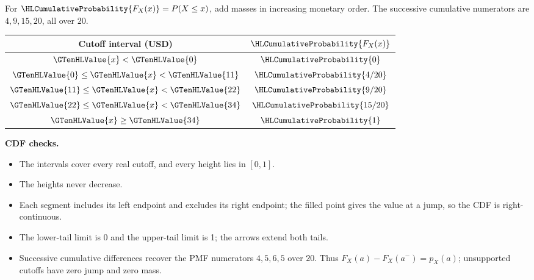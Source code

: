 For $\HLCumulativeProbability{F_X(x)}=P(X\leq x)$, add masses in increasing monetary order. The successive cumulative numerators are $4,9,15,20$, all over $20$.
\begin{center}
\begin{tabular}{cc}\toprule
Cutoff interval (USD) & $\HLCumulativeProbability{F_X(x)}$\\
\midrule
$\GTenHLValue{x}<\GTenHLValue{0}$ & $\HLCumulativeProbability{0}$\\
$\GTenHLValue{0}\leq \GTenHLValue{x}<\GTenHLValue{11}$ & $\HLCumulativeProbability{4/20}$\\
$\GTenHLValue{11}\leq \GTenHLValue{x}<\GTenHLValue{22}$ & $\HLCumulativeProbability{9/20}$\\
$\GTenHLValue{22}\leq \GTenHLValue{x}<\GTenHLValue{34}$ & $\HLCumulativeProbability{15/20}$\\
$\GTenHLValue{x}\geq \GTenHLValue{34}$ & $\HLCumulativeProbability{1}$\\
\bottomrule\end{tabular}
\end{center}
\begin{center}\end{center}\textbf{CDF checks.}\begin{itemize}\item The intervals cover every real cutoff, and every height lies in $[0,1]$.\item The heights never decrease.\item Each segment includes its left endpoint and excludes its right endpoint; the filled point gives the value at a jump, so the CDF is right-continuous.\item The lower-tail limit is 0 and the upper-tail limit is 1; the arrows extend both tails.\item Successive cumulative differences recover the PMF numerators $4,5,6,5$ over $20$. Thus $F_X(a)-F_X(a^-)=p_X(a)$; unsupported cutoffs have zero jump and zero mass.\end{itemize}

